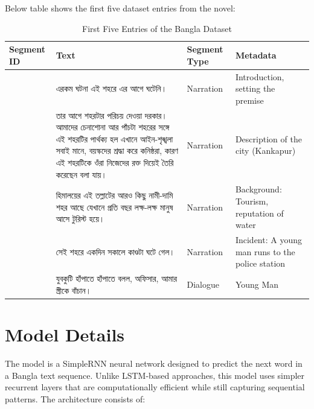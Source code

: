 \documentclass[12pt]{article}
\begin{document}
Below table shows the first five dataset entries from the novel:

\begin{table}[H]
\centering
\caption{First Five Entries of the Bangla Dataset}
\label{tab:dataset_sample}
\begin{tabular}{|>{\raggedright\arraybackslash}p{1.5cm}|>{\raggedright\arraybackslash}p{6cm}|>{\raggedright\arraybackslash}p{2cm}|>{\raggedright\arraybackslash}p{3cm}|}
\hline
\textbf{Segment ID} & \textbf{Text} & \textbf{Segment Type} & \textbf{Metadata} \\
\hline
1 & {\bengalifont এরকম ঘটনা এই শহরে এর আগে ঘটেনি।} & Narration & Introduction, setting the premise \\
\hline
2 & {\bengalifont তার আগে শহরটার পরিচয় দেওয়া দরকার। আমাদের চেনাশোনা আর পাঁচটা শহরের সঙ্গে এই শহরটির পার্থক্য হল এখানে আইন-শৃঙ্খলা সবাই মানে, বয়স্কদের শ্রদ্ধা করে কনিষ্ঠরা, কারণ এই শহরটিকে ওঁরা নিজেদের রক্ত দিয়েই তৈরি করেছেন বলা যায়।} & Narration & Description of the city (Kankapur) \\
\hline
3 & {\bengalifont হিমালয়ের এই তল্লাটের আরও কিছু নামী-দামি শহর আছে যেখানে প্রতি বছর লক্ষ-লক্ষ মানুষ আসে টুরিস্ট হয়ে।} & Narration & Background: Tourism, reputation of water \\
\hline
4 & {\bengalifont সেই শহরে একদিন সকালে কাণ্ডটা ঘটে গেল।} & Narration & Incident: A young man runs to the police station \\
\hline
5 & {\bengalifont যুবকুটি হাঁপাতে হাঁপাতে বলল, অফিসার, আমার স্ত্রীকে বাঁচান।} & Dialogue & Young Man \\
\hline
\end{tabular}
\end{table}

\section*{Model Details}
The model is a SimpleRNN neural network designed to predict the next word in a Bangla text sequence. Unlike LSTM-based approaches, this model uses simpler recurrent layers that are computationally efficient while still capturing sequential patterns. The architecture consists of:
\end{document}
